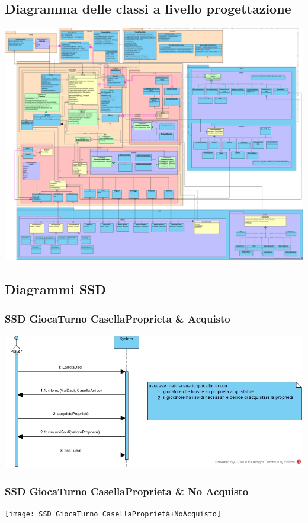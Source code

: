 \documentclass{article}
\begin{document}
\subsection{Diagramma delle classi a livello progettazione}
\href{https://github.com/UnimibSoftEngCourse2022/progetto-monopoly-1-gangoffour2/blob/feat/doc/doc/img/DiagrammaDelleClassi.jpg?raw=true}
	{\includegraphics[width=\textwidth]{DiagrammaDelleClassi}}

\subsection{Diagrammi SSD}
\subsubsection{SSD GiocaTurno CasellaProprieta \& Acquisto}
\includegraphics[width=\textwidth]{SSD_GiocaTurno_CasellaProprieta+Acquisto}
\subsubsection{SSD GiocaTurno CasellaProprieta \& No Acquisto}
\texttt{[image: SSD\_GiocaTurno\_CasellaProprietà+NoAcquisto]}
\end{document}
